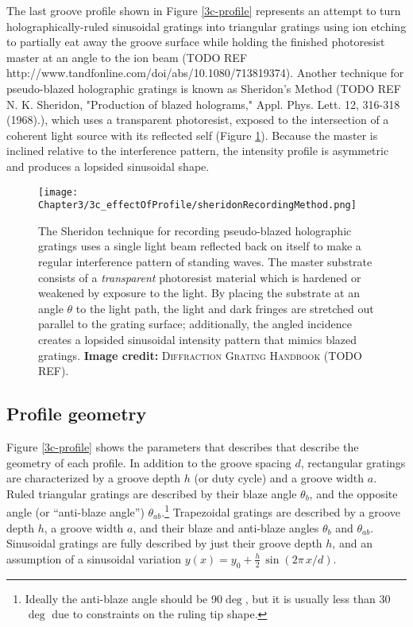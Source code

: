 The last groove profile shown in Figure \ref{3c-profile} represents an attempt to turn holographically-ruled sinusoidal gratings into triangular gratings using ion etching to partially eat away the groove surface while holding the finished photoresist master at an angle to the ion beam (TODO REF http://www.tandfonline.com/doi/abs/10.1080/713819374).  Another technique for pseudo-blazed holographic gratings is known as Sheridon's Method (TODO REF N. K. Sheridon, "Production of blazed holograms," Appl. Phys. Lett. 12, 316-318 (1968).), which uses a transparent photoresist, exposed to the intersection of a coherent light source with its reflected self (Figure \ref{3c-sheridon}).  Because the master is inclined relative to the interference pattern, the intensity profile is asymmetric and produces a lopsided sinusoidal shape.

\begin{figure}[htbp] %
   \centering
   \texttt{[image: Chapter3/3c\_effectOfProfile/sheridonRecordingMethod.png]}
   \caption[The Sheridon technique for recording pseudo-blazed holographic gratings uses a single light beam reflected back on itself to make a regular interference pattern of standing waves.  The master substrate consists of a \emph{transparent} photoresist material which is hardened or weakened by exposure to the light.]{The Sheridon technique for recording pseudo-blazed holographic gratings uses a single light beam reflected back on itself to make a regular interference pattern of standing waves.  The master substrate consists of a \emph{transparent} photoresist material which is hardened or weakened by exposure to the light.  By placing the substrate at an angle $\theta$ to the light path, the light and dark fringes are stretched out parallel to the grating surface; additionally, the angled incidence creates a lopsided sinusoidal intensity pattern that mimics blazed gratings. \textbf{Image credit: }\textsc{Diffraction Grating Handbook} (TODO REF).}
   \label{3c-sheridon}
\end{figure}


\subsection{Profile geometry}
Figure \ref{3c-profile} shows the parameters that describes that describe the geometry of each profile.  In addition to the groove spacing $d$, rectangular gratings are characterized by a groove depth $h$ (or duty cycle) and a groove width $a$.  Ruled triangular gratings are described by their blaze angle $\theta_b$, and the opposite angle (or ``anti-blaze angle'') $\theta_{ab}$.\footnote{Ideally the anti-blaze angle should be 90$\deg$, but it is usually less than 30$\deg$ due to constraints on the ruling tip shape.}  Trapezoidal gratings are described by a groove depth $h$, a groove width $a$, and their blaze and anti-blaze angles $\theta_b$ and $\theta_{ab}$.  Sinusoidal gratings are fully described by just their groove depth $h$, and an assumption of a sinusoidal variation $y(x) = y_0 + \frac{h}{2}\, \sin(2\pi \,x / d)$.

